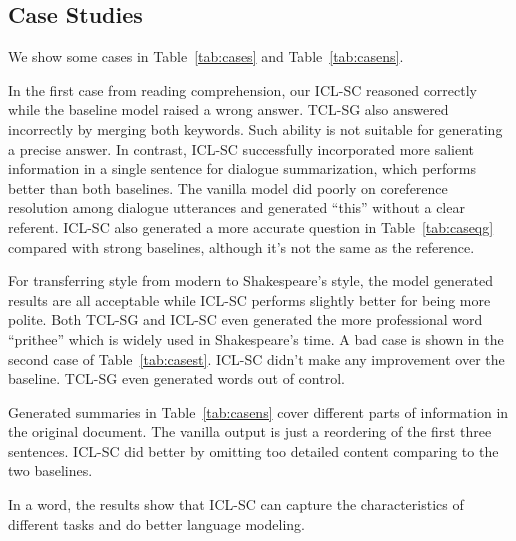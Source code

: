 \subsection{Case Studies}
\label{sec:casestudies}

We show some cases in Table~\ref{tab:cases} and Table~\ref{tab:casens}.%

In the first case from reading comprehension, our ICL-SC reasoned correctly while the baseline model raised a wrong answer. TCL-SG also answered incorrectly by merging both keywords. 
Such ability is not suitable for generating a precise answer.
In contrast, ICL-SC successfully incorporated more salient information in a single sentence for dialogue summarization, which performs better than both baselines. The vanilla model did poorly on coreference resolution among dialogue utterances and generated ``this'' without a clear referent. 
ICL-SC also generated a more accurate question in Table~\ref{tab:caseqg} compared with strong baselines, although it's not the same as the reference.

For transferring style from modern to Shakespeare's style, the model generated results are all acceptable while ICL-SC performs slightly better for being more polite. Both TCL-SG and ICL-SC even generated the more professional word ``prithee'' which is widely used in Shakespeare's time. A bad case is shown in the second case of Table~\ref{tab:casest}. ICL-SC didn't make any improvement over the baseline. TCL-SG even generated words out of control.

Generated summaries in Table~\ref{tab:casens} cover different parts of information in the original document. The vanilla output is just a reordering of the first three sentences.
ICL-SC did better by omitting too detailed content comparing to the two baselines. 

In a word, the results show that ICL-SC can capture the characteristics of different tasks and do better language modeling.












